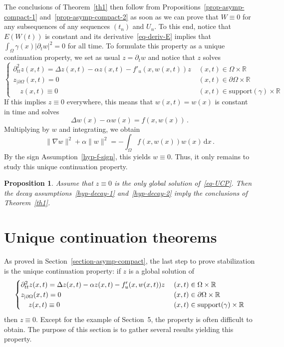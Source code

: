 \documentclass[11pt]{article}
\newtheorem{prop}[theo]{Proposition}
\theoremstyle{definition}
\numberwithin{equation}{section}
\numberwithin{figure}{section}
\numberwithin{table}{section}
\newcommand{\RR}{\mathbb{R}}
\newcommand{\drm}{\mathrm{d}}
\newcommand{\grad}{\nabla}
\begin{document}
The conclusions of Theorem~\ref{th1} then follow from Propositions~\ref{prop-asymp-compact-1} and~\ref{prop-asymp-compact-2} as soon as we can prove that $W\equiv 0$ for any subsequences of any sequences $(t_n)$ and $U_n$. To this end, notice that $E(W(t))$ is constant and its derivative~\eqref{eq-deriv-E} implies that $\int_\Omega \gamma(x) |\partial_t w|^2=0$ for all time. To formulate this property as a unique continuation property, we set as usual $z=\partial_t w$ and notice that $z$ solves
\begin{equation}\label{eq-UCP}
\begin{cases}
\partial_{tt}^2 z(x,t) = \Delta z(x,t) - \alpha z(x,t) - f'_u(x,w(x,t)) z\;&(x,t)\in\Omega\times\RR\\
z_{|\partial\Omega}(x,t)=0&(x,t)\in\partial\Omega\times \RR\\
\quad z(x,t)\equiv 0 & (x,t)\in \text{support}(\gamma)\times \RR
\end{cases}
\end{equation}
If this implies $z\equiv 0$ everywhere, this means that $w(x,t)=w(x)$ is constant in time and solves
\[
\Delta w(x)-\alpha w(x)=f(x,w(x))\,.
\]
Multiplying by $w$ and integrating, we obtain
\[
\|\grad w\|^2 +\alpha \|w\|^2 = -\int_\Omega f(x,w(x))w(x)\,\drm x\,.
\]
By the sign Assumption~\eqref{hyp-f-sign}, this yields $w\equiv 0$. Thus, it only remains to study this unique continuation property.

\begin{prop}\label{prop-UCP-implique-th}
Assume that $z\equiv 0$ is the only global solution of~\eqref{eq-UCP}. Then the decay assumptions~\eqref{hyp-decay-1} and~\eqref{hyp-decay-2} imply the conclusions of Theorem~\ref{th1}.
\end{prop}


\setcounter{section}{5}
\section{Unique continuation theorems}\label{section-UCP}
As proved in Section~\ref{section-asymp-compact}, the last step to prove stabilization is the unique continuation property: if $z$ is a global solution of
\begin{equation}\label{eq-UCP2}
\begin{cases}
\partial_{tt}^2 z(x,t) = \Delta z(x,t) - \alpha z(x,t) - f'_u(x,w(x,t)) z\;&(x,t)\in\Omega\times\RR\\
z_{|\partial\Omega}(x,t)=0&(x,t)\in\partial\Omega\times \RR\\
\mkern20mu z(x,t)\equiv 0 & (x,t)\in \text{support}(\gamma)\times \RR
\end{cases}
\end{equation}
then $z\equiv 0$. Except for the example of Section~5, the property is often difficult to obtain. The purpose of this section is to gather several results yielding this property.
\end{document}
